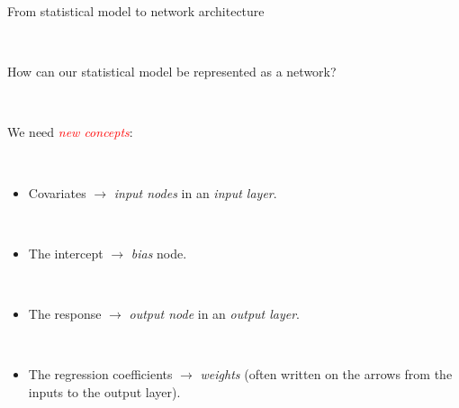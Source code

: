\documentclass[10pt,ignorenonframetext,]{beamer}
\providecommand{\tightlist}{%
  \setlength{\itemsep}{0pt}\setlength{\parskip}{0pt}}
\begin{document}
\begin{frame}

\begin{block}{From statistical model to network architecture}

\(~\)

How can our statistical model be represented as a network?

\(~\)

We need \emph{\textcolor{red}{new concepts}}:

\(~\)

\begin{itemize}
\tightlist
\item
  Covariates \(\rightarrow\) \emph{input nodes} in an \emph{input
  layer}.
\end{itemize}

\(~\)

\begin{itemize}
\tightlist
\item
  The intercept \(\rightarrow\) \emph{bias} node.
\end{itemize}

\(~\)

\begin{itemize}
\tightlist
\item
  The response \(\rightarrow\) \emph{output node} in an \emph{output
  layer}.
\end{itemize}

\(~\)

\begin{itemize}
\tightlist
\item
  The regression coefficients \(\rightarrow\) \emph{weights} (often
  written on the arrows from the inputs to the output layer).
\end{itemize}

\end{block}

\end{frame}
\end{document}
